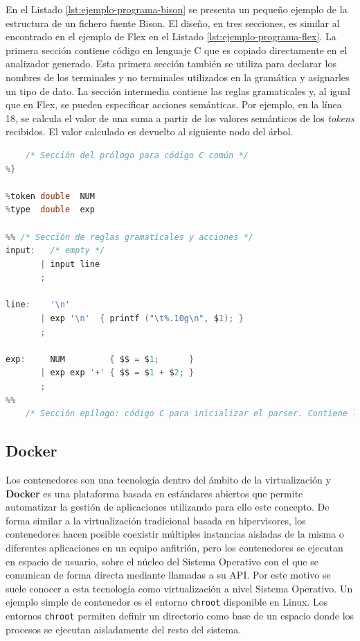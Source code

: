 

En el Listado \ref{lst:ejemplo-programa-bison} se presenta un pequeño ejemplo de la estructura de un fichero fuente Bison. El diseño, en tres secciones, es similar al encontrado en el ejemplo de Flex en el Listado \ref{lst:ejemplo-programa-flex}. La primera sección contiene código en lenguaje C que es copiado directamente en el analizador generado. Esta primera sección también se utiliza para declarar los nombres de los terminales y no terminales utilizados en la gramática y asignarles un tipo de dato. La sección intermedia contiene las reglas gramaticales y, al igual que en Flex, se pueden especificar acciones semánticas. Por ejemplo, en la línea 18, se calcula el valor de una suma a partir de los valores semánticos de los \emph{tokens} recibidos. El valor calculado es devuelto al siguiente nodo del árbol.

\begin{lstlisting}[language=C,caption={Ejemplo de programa Bison \cite{mit_web_bisonExample}},label=lst:ejemplo-programa-bison]
%{
    /* Sección del prólogo para código C común */
%}

%token double  NUM
%type  double  exp

%% /* Sección de reglas gramaticales y acciones */
input:   /* empty */
       | input line
       ;

line:    '\n'
       | exp '\n'  { printf ("\t%.10g\n", $1); }
       ;
    
exp:     NUM         { $$ = $1;      }
       | exp exp '+' { $$ = $1 + $2; }
       ;
%%
    /* Sección epílogo: código C para inicializar el parser. Contiene la función main() */
\end{lstlisting}

\subsection{Docker}

Los contenedores son una tecnología dentro del ámbito de la virtualización y \textbf{Docker} es una plataforma basada en estándares abiertos que permite automatizar la gestión de aplicaciones utilizando para ello este concepto. De forma similar a la virtualización tradicional basada en \gls{hipervisores}, los contenedores hacen posible coexistir múltiples instancias aisladas de la misma o diferentes aplicaciones en un  equipo anfitrión, pero los contenedores se ejecutan en espacio de usuario, sobre el núcleo del Sistema Operativo con el que se comunican de forma directa mediante llamadas a su API. Por este motivo se suele conocer a esta tecnología como virtualización a nivel Sistema Operativo. Un ejemplo simple de contenedor es el entorno \verb|chroot| disponible en Linux. Los entornos \verb|chroot| permiten definir un directorio como base de un espacio donde los procesos se ejecutan aisladamente del resto del sistema. 

